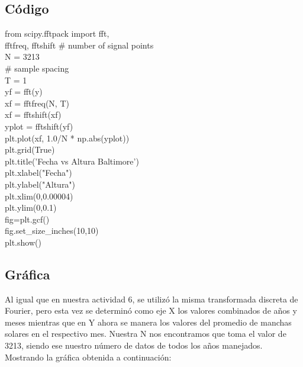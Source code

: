 \documentclass[a4paper,12pt]{article}
\begin{document}
\subsection{Código}
from scipy.fftpack import fft,\\ fftfreq, fftshift
\# number of signal points\\
N = 3213\\
\# sample spacing\\
T = 1\\
yf = fft(y)\\
xf = fftfreq(N, T)\\
xf = fftshift(xf)\\
yplot = fftshift(yf)\\
plt.plot(xf, 1.0/N * np.abs(yplot))\\
plt.grid(True)\\
plt.title('Fecha vs Altura Baltimore')\\
plt.xlabel("Fecha")\\
plt.ylabel("Altura")\\
plt.xlim(0,0.00004)\\
plt.ylim(0,0.1)\\
fig=plt.gcf()\\
fig.set\_size\_inches(10,10)\\
plt.show()

\subsection{Gráfica}
\noindent
Al igual que en nuestra actividad 6, se utilizó la misma transformada discreta de Fourier, pero esta vez se determinó como eje X los valores combinados de años y meses mientras que en Y ahora se manera los valores del promedio de manchas solares en el respectivo mes. Nuestra N nos encontramos que toma el valor de 3213, siendo ese nuestro número de datos de todos los años manejados.  Mostrando la gráfica obtenida a continuación:
\end{document}
